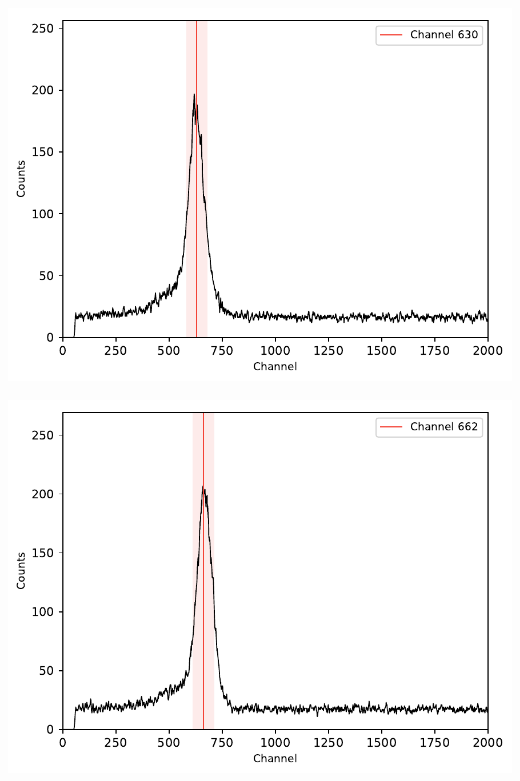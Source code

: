 \begin{multicols}{2}
\begin{center}
\begin{adjustbox}{max width=\linewidth, keepaspectratio}
        \end{adjustbox}
        \label{fig:137Cskoinz2}
    \end{center}
\endminipage
%
\vspace{10mm}
%
\minipage{\linewidth}
    \begin{center}
        \captionsetup{type=figure}
        \begin{adjustbox}{max width=\linewidth, keepaspectratio}
            \includegraphics[]{pdf/137CsTPHC}
        \end{adjustbox}
        \label{fig:137CsTPHC}
    \end{center}
\endminipage
%
\vspace{10mm}
%
\minipage{\linewidth}
    \begin{center}
        \captionsetup{type=figure}
        \begin{adjustbox}{max width=\linewidth, keepaspectratio}
            \includegraphics[]{pdf/137CsTPHC20ns}

\end{adjustbox}
\end{center}
\end{multicols}
